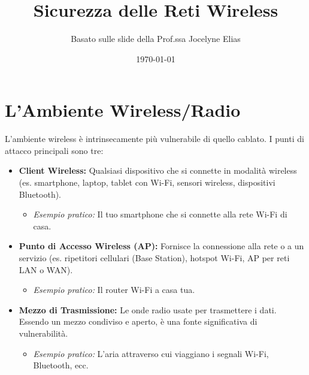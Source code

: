 

\title{Sicurezza delle Reti Wireless}
\author{Basato sulle slide della Prof.ssa Jocelyne Elias}
\date{\today}



\maketitle
\tableofcontents
\newpage

\section{L'Ambiente Wireless/Radio}
L'ambiente wireless è intrinsecamente più vulnerabile di quello cablato. I punti di attacco principali sono tre:

\begin{itemize}
    \item \textbf{Client Wireless:} Qualsiasi dispositivo che si connette in modalità wireless (es. smartphone, laptop, tablet con Wi-Fi, sensori wireless, dispositivi Bluetooth).
    \begin{itemize}
        \item \textit{Esempio pratico:} Il tuo smartphone che si connette alla rete Wi-Fi di casa.
    \end{itemize}
    \item \textbf{Punto di Accesso Wireless (AP):} Fornisce la connessione alla rete o a un servizio (es. ripetitori cellulari (Base Station), hotspot Wi-Fi, AP per reti LAN o WAN).
    \begin{itemize}
        \item \textit{Esempio pratico:} Il router Wi-Fi a casa tua.
    \end{itemize}
    \item \textbf{Mezzo di Trasmissione:} Le onde radio usate per trasmettere i dati. Essendo un mezzo condiviso e aperto, è una fonte significativa di vulnerabilità.
    \begin{itemize}
        \item \textit{Esempio pratico:} L'aria attraverso cui viaggiano i segnali Wi-Fi, Bluetooth, ecc.
    \end{itemize}
\end{itemize}

